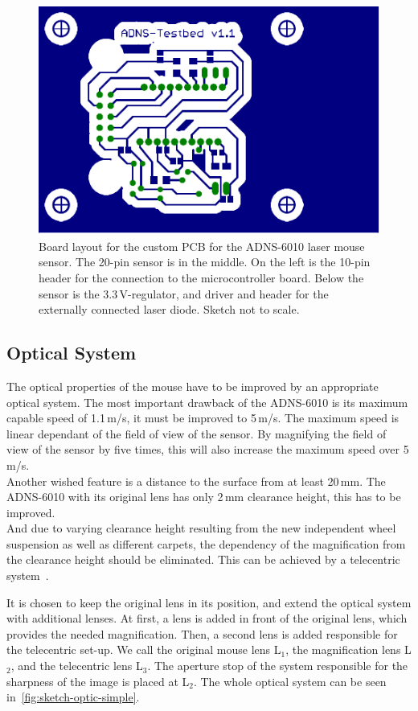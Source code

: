 \documentclass[12pt,a4paper]{article}
\begin{document}
\begin{figure}[htbp]
\begin{center}
\includegraphics[width=0.5\columnwidth]{figures/platine}
\caption{\label{fig:testplatine-board}
Board layout for the custom PCB for the ADNS-6010 laser mouse sensor.
The 20-pin sensor is in the middle.
On the left is the 10-pin header for the connection to the microcontroller board.
Below the sensor is the 3.3\,V-regulator, and driver and header for the externally connected laser diode.
Sketch not to scale.
}
\end{center}
\end{figure}

\subsection{Optical System}
\label{optics}


The optical properties of the mouse have to be improved by an appropriate optical system.
The most important drawback of the ADNS-6010 is its maximum capable speed of 1.1\,m/s, it must be improved to 5\,m/s. 
The maximum speed is linear dependant of the field of view of the sensor.
By magnifying the field of view of the sensor by five times, this will also increase the maximum speed over 5\,m/s.\\
Another wished feature is a distance to the surface from at least 20\,mm.
The ADNS-6010 with its original lens has only 2\,mm clearance height, this has to be improved.\\
And due to varying clearance height resulting from the new independent wheel suspension as well as different carpets, the dependency of the magnification from the clearance height should be eliminated.
This can be achieved by a telecentric system~\cite{telec}.

It is chosen to keep the original lens in its position, and extend the optical system with additional lenses.
At first, a lens is added in front of the original lens, which provides the needed magnification.
Then, a second lens is added responsible for the telecentric set-up.
We call the original mouse lens L$_1$, the magnification lens L$_2$, and the telecentric lens L$_3$. 
The aperture stop of the system responsible for the sharpness of the image is placed at L$_2$.
The whole optical system can be seen in~\autoref{fig:sketch-optic-simple}.
\end{document}
